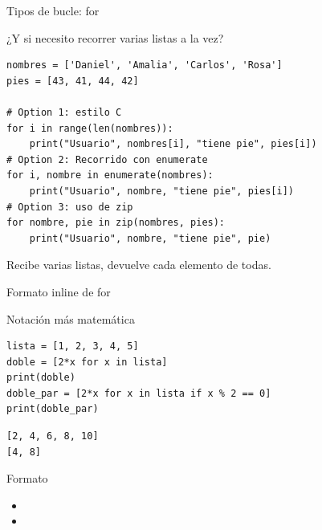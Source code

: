 \documentclass[bigger,unknownkeysallowed]{beamer}
\begin{document}
\begin{frame}[fragile,label={sec:org42c083c}]{Tipos de bucle: for}
 \begin{exampleblock}{¿Y si necesito recorrer varias listas a la vez?}
\begin{verbatim}
nombres = ['Daniel', 'Amalia', 'Carlos', 'Rosa']
pies = [43, 41, 44, 42]

# Option 1: estilo C
for i in range(len(nombres)):
    print("Usuario", nombres[i], "tiene pie", pies[i])
# Option 2: Recorrido con enumerate
for i, nombre in enumerate(nombres):
    print("Usuario", nombre, "tiene pie", pies[i])
# Option 3: uso de zip
for nombre, pie in zip(nombres, pies):
    print("Usuario", nombre, "tiene pie", pie)
\end{verbatim}

Recibe varias listas, devuelve cada elemento de todas.
\end{exampleblock}
\end{frame}

\begin{frame}[fragile,label={sec:org4af7306}]{Formato inline de for}
 \begin{block}{Notación más matemática}
\begin{verbatim}
lista = [1, 2, 3, 4, 5]
doble = [2*x for x in lista]
print(doble)
doble_par = [2*x for x in lista if x % 2 == 0]
print(doble_par)
\end{verbatim}
\scriptsize
\begin{verbatim}
[2, 4, 6, 8, 10]
[4, 8]
\end{verbatim}
\end{block}

\begin{block}{Formato}
\begin{itemize}
\item{}

\item{}
\end{itemize}
\end{block}
\end{frame}
\end{document}
